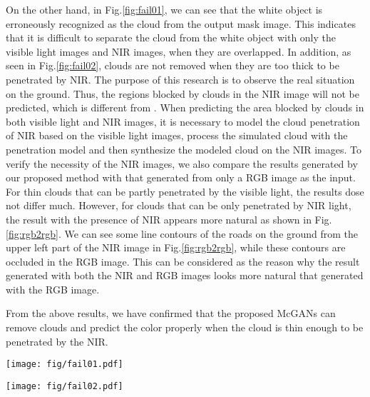 \documentclass[10pt,twocolumn,letterpaper]{article}
\begin{document}
On the other hand, in Fig.\ref{fig:fail01}, we can see that the white object is erroneously recognized as the cloud from the output mask image. This indicates that it is difficult to separate the cloud from the white object with only the visible light images and NIR images, when they are overlapped.
In addition, as seen in Fig.\ref{fig:fail02}, clouds are not removed when they are too thick to be penetrated by NIR. The purpose of this research is to observe the real situation on the ground. Thus, the regions blocked by clouds in the NIR image will not be predicted, which is different from \cite {pathak2016context}. 
When predicting the area blocked by clouds in both visible light and NIR images, it is necessary to model the cloud penetration of NIR based on the visible light images, process the simulated cloud with the penetration model and then synthesize the modeled cloud on the NIR images.
To verify the necessity of the NIR images, we also compare the results generated by our proposed method with that generated from only a RGB image as the input. For thin clouds that can be partly penetrated by the visible light, the results dose not differ much. However, for clouds that can be only penetrated by NIR light, the result with the presence of NIR appears more natural as shown in Fig.\ref{fig:rgb2rgb}. We can see some line contours of the roads on the ground from the upper left part of the NIR image in Fig.\ref{fig:rgb2rgb}, while these contours are occluded in the RGB image. This can be considered as the reason why the result generated with both the NIR and RGB images looks more natural that generated with the RGB image.


From the above results, we have confirmed that the proposed McGANs can remove clouds and predict the color properly when the cloud is thin enough to be penetrated by the NIR.






\begin{figure*}[thb]
\begin{center}
\hspace*{0mm}\texttt{[image: fig/fail01.pdf]}
\vspace{-2mm}

\caption{Failure case due to a white object}
\label{fig:fail01}
\end{center}
\end{figure*}

\begin{figure*}[h!]
\begin{center}
\hspace*{0mm}\texttt{[image: fig/fail02.pdf]}
\vspace{-2mm}

\caption{Thick cloud case}
\label{fig:fail02}
\vspace{-3mm}
\end{center}
\end{figure*}
\end{document}

